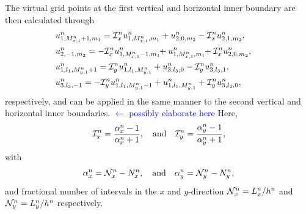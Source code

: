 \documentclass[fleqn]{jaes}
\def\SWcomment[#1]{\textcolor{blue}{#1}}
\begin{document}
The virtual grid points at the first vertical and horizontal inner boundary are then calculated through
\begin{subequations}\label{eq:connectionInterpol2D}
    \begin{align}
            &\!\!\!\!\!\!\!\!u_{1, M_{x,1}^n+1, m_1}^n = \Aterm_x u_{1, M_{x,1}^n, m_1}^n + u_{2, 0, m_2}^n - \Aterm_x u_{2, 1, m_2}^n,\\
            &\!\!\!\!\!\!\!\!u_{2, -1, m_2}^n = -\Aterm_x u_{1, M_{x, 1}^n-1, m_1}^n\!\! + u_{1, M_{x,1}^n, m_1}^n\!\!+\Aterm_x u_{2, 0, m_2}^n,\\
            &\!\!\!\!\!\!\!\!u_{1, l_1, M_{y,1}^n+1}^n = \Aterm_y u_{1, l_1, M_{y,1}^n}^n + u_{3, l_3, 0}^n - \Aterm_y u_{3, l_3, 1}^n,\\
            &\!\!\!\!\!\!\!\!u_{3, l_3, -1}^n = -\Aterm_y u_{1, l_1, M_{y, 1}^n-1}^n + u_{1, l_1, M_{y,1}^n}^n+\Aterm_y u_{3, l_2, 0}^n,
    \end{align}
\end{subequations}
respectively, and can be applied in the same manner to the second vertical and horizontal inner boundaries. \SWcomment[$\leftarrow$ possibly elaborate here] Here, 
\begin{equation}\label{eq:axayDef}
    \Aterm_x = \frac{\alpha_x^n-1}{\alpha_x^n+1}, \qaq \Aterm_y = \frac{\alpha_y^n-1}{\alpha_y^n+1},
\end{equation}
with 
\begin{equation}
    \alpha_x^n = \Nfrac_x^n - N_x^n, \qaq \alpha_y^n = \Nfrac_y^n - N_y^n,
\end{equation}
and fractional number of intervals in the $x$ and $y$-direction $\mathcal{N}_x^n = L_x^n / h^n$ and $\mathcal{N}_y^n = L_y^n / h^n$ respectively.
\end{document}
